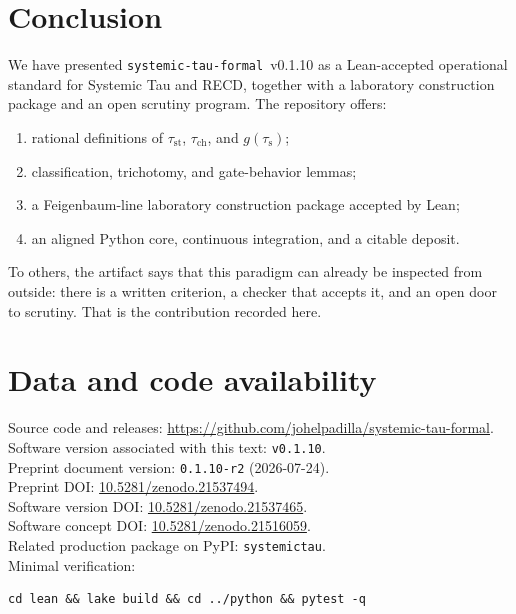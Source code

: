 \documentclass[11pt,a4paper]{article}
\newcommand{\taus}{\tau_{\mathrm{s}}}
\newcommand{\taust}{\tau_{\mathrm{st}}}
\newcommand{\tauch}{\tau_{\mathrm{ch}}}
\begin{document}
\section{Conclusion}

We have presented \texttt{systemic-tau-formal}~v0.1.10 as a Lean-accepted operational standard for Systemic Tau and RECD, together with a laboratory construction package and an open scrutiny program. The repository offers:

\begin{enumerate}[leftmargin=1.4em]
  \item rational definitions of \(\taust\), \(\tauch\), and \(g(\taus)\);
  \item classification, trichotomy, and gate-behavior lemmas;
  \item a Feigenbaum-line laboratory construction package accepted by Lean;
  \item an aligned Python core, continuous integration, and a citable deposit.
\end{enumerate}

To others, the artifact says that this paradigm can already be inspected from outside: there is a written criterion, a checker that accepts it, and an open door to scrutiny. That is the contribution recorded here.

\section*{Data and code availability}

Source code and releases: \url{https://github.com/johelpadilla/systemic-tau-formal}.\\
Software version associated with this text: \texttt{v0.1.10}.\\
Preprint document version: \texttt{0.1.10-r2} (2026-07-24).\\
Preprint DOI: \href{https://doi.org/10.5281/zenodo.21537494}{10.5281/zenodo.21537494}.\\
Software version DOI: \href{https://doi.org/10.5281/zenodo.21537465}{10.5281/zenodo.21537465}.\\
Software concept DOI: \href{https://doi.org/10.5281/zenodo.21516059}{10.5281/zenodo.21516059}.\\
Related production package on PyPI: \texttt{systemictau}.\\[0.4em]
Minimal verification:
\begin{verbatim}
cd lean && lake build && cd ../python && pytest -q
\end{verbatim}
\end{document}
